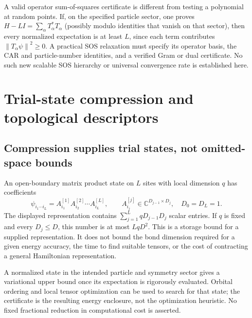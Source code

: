 \documentclass[11pt,a4paper]{article}
\theoremstyle{plain}
\theoremstyle{definition}
\theoremstyle{remark}
\newcommand{\norm}[1]{\left\lVert #1\right\rVert}
\newcommand{\C}{\mathbb{C}}
\begin{document}
A valid operator sum-of-squares certificate is different from testing a
polynomial at random points. If, on the specified particle sector, one proves
$H-LI=\sum_\alpha T_\alpha^*T_\alpha$ (possibly modulo identities
that vanish on that sector), then every normalized expectation is at least
$L$, since each term contributes $\norm{T_\alpha\psi}^2\ge0$.
A practical SOS relaxation must specify its operator basis, the CAR and
particle-number identities, and a verified Gram or dual certificate. No such
new scalable SOS hierarchy or universal convergence rate is established here.

\section{Trial-state compression and topological descriptors}
\label{sec:tensor}
\subsection{Compression supplies trial states, not omitted-space bounds}
An open-boundary matrix product state on $L$ sites with local dimension $q$
has coefficients
\[
 \psi_{i_1\cdots i_L}
 =A^{[1]}_{i_1}A^{[2]}_{i_2}\cdots A^{[L]}_{i_L},
 \qquad A^{[j]}_{i_j}\in\C^{D_{j-1}\times D_j},\quad D_0=D_L=1.
\]
The displayed representation contains
$\sum_{j=1}^L qD_{j-1}D_j$ scalar entries. If $q$ is fixed and every
$D_j\le D$, this number is at most $LqD^2$. This is a storage bound
for a supplied representation. It does not bound the bond dimension required
for a given energy accuracy, the time to find suitable tensors, or the cost
of contracting a general Hamiltonian representation.

A normalized state in the intended particle and symmetry sector gives a
variational upper bound once its expectation is rigorously evaluated. Orbital
ordering and local tensor optimization can be used to search for that state;
the certificate is the resulting energy enclosure, not the optimization
heuristic. No fixed fractional reduction in computational cost is asserted.
\end{document}
